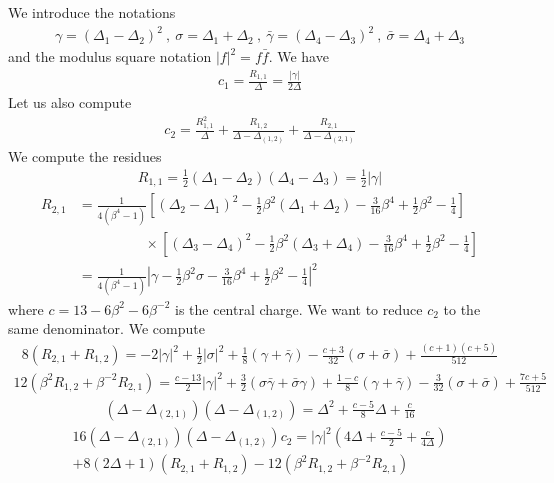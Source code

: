 \documentclass[12pt,a4paper]{article}
\begin{document}
We introduce the notations 
\begin{align}
 \gamma = (\Delta_1-\Delta_2)^2 \ , \ \sigma = \Delta_1+\Delta_2 \ , \ \bar\gamma = (\Delta_4-\Delta_3)^2 \ , \ \bar\sigma = \Delta_4+\Delta_3 
\end{align}
and the modulus square notation $|f|^2 = f\bar f$. 
We have 
\begin{align}
 c_1 = \frac{R_{1,1}}{\Delta} = \frac{|\gamma|}{2\Delta}
\end{align}
Let us also compute 
\begin{align}
 c_2 = \frac{R_{1,1}^2}{\Delta} +\frac{R_{1,2}}{\Delta-\Delta_{(1,2)}} + \frac{R_{2,1}}{\Delta-\Delta_{(2,1)}}
\end{align}
We compute the residues 
\begin{align}
 R_{1,1} = \tfrac12 (\Delta_1-\Delta_2)(\Delta_4-\Delta_3)  = \tfrac12 |\gamma| 
 \end{align}
 \begin{align}
   R_{2,1} &= \frac{1}{4(\beta^4-1)}\left[(\Delta_2-\Delta_1)^2 -\tfrac12 \beta^2(\Delta_1+\Delta_2) -\tfrac{3}{16}\beta^4+\tfrac12\beta^2-\tfrac14\right] 
   \\
 & \hspace{2cm} \times \left[(\Delta_3-\Delta_4)^2 -\tfrac12 \beta^2(\Delta_3+\Delta_4) -\tfrac{3}{16}\beta^4+\tfrac12\beta^2-\tfrac14\right] 
 \\
  &= \frac{1}{4(\beta^4-1)}\left|\gamma -\tfrac12 \beta^2 \sigma -\tfrac{3}{16}\beta^4+\tfrac12\beta^2-\tfrac14\right|^2 
 \end{align}
 where $c=13-6\beta^2-6\beta^{-2}$ is the central charge. 
We want to reduce $c_2$ to the same denominator. We compute 
\begin{align}
 8(R_{2,1}+R_{1,2})= -2 |\gamma|^2 +\tfrac{1}{2}|\sigma|^2
 +\tfrac{1}{8} (\gamma+\bar\gamma) -\tfrac{c+3}{32}(\sigma+\bar\sigma) + \tfrac{(c+1)(c+5)}{512}
\end{align}
\begin{align}
 12(\beta^2R_{1,2}+\beta^{-2}R_{2,1}) = \tfrac{c-13}{2}|\gamma|^2 +\tfrac32(\sigma\bar\gamma+\bar\sigma\gamma)+\tfrac{1-c}{8}(\gamma+\bar\gamma) -\tfrac{3}{32}(\sigma+\bar\sigma)+\tfrac{7c+5}{512}
\end{align}
\begin{align}
 (\Delta-\Delta_{(2,1)})(\Delta-\Delta_{(1,2)}) = \Delta^2 + \tfrac{c-5}{8}\Delta + \tfrac{c}{16}
\end{align}
\begin{multline}
 16(\Delta-\Delta_{(2,1)})(\Delta-\Delta_{(1,2)}) c_2 = |\gamma|^2\left(4\Delta + \tfrac{c-5}{2} + \tfrac{c}{4\Delta}\right)
 \\
 +8(2\Delta+1)(R_{2,1}+R_{1,2}) -12(\beta^2R_{1,2}+\beta^{-2}R_{2,1})
\end{multline}
\end{document}
